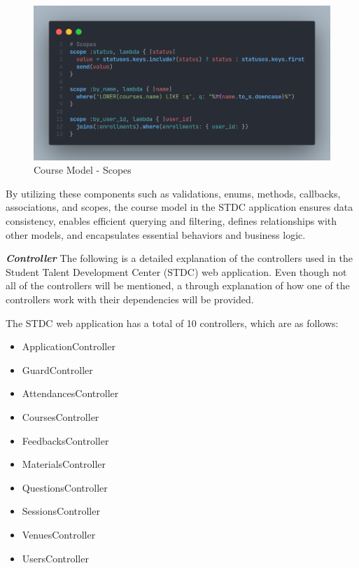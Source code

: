 \begin{justify}
        \begin{figure}[H]
            \centerline{\includegraphics[width=150mm,scale=1]{figures/implementation_and_testing/implementation/backend/course_scopes.png}}
            \caption{Course Model - Scopes}
        \end{figure}

        \vspace{0.25cm}
        \newendline By utilizing these components such as validations, enums, methods, callbacks, associations, and scopes, the course model in the STDC application ensures data consistency, enables efficient querying and filtering, defines relationships with other models, and encapsulates essential behaviors and business logic.

    \clearpage

    

    \vspace{0.25cm}
    \newendline \textbf{\textit{Controller}}\newendline
    The following is a detailed explanation of the controllers used in the Student Talent Development Center (STDC) web application. Even though not all of the controllers will be mentioned, a through explanation of how one of the controllers work with their dependencies will be provided.

    \vspace{0.25cm}
    \newendline The STDC web application has a total of 10 controllers, which are as follows:
        
    \begin{itemize}
        \item ApplicationController
        \item GuardController
        \item AttendancesController
        \item CoursesController
        \item FeedbacksController
        \item MaterialsController
        \item QuestionsController
        \item SessionsController
        \item VenuesController
        \item UsersController
    \end{itemize}


\end{justify}
